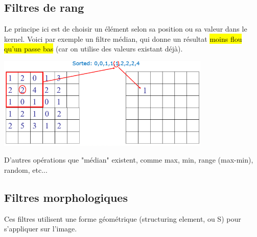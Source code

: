 \documentclass[letterpaper, 12pt]{article}
\newcommand{\alinea}{
\hspace*{0.5cm}}
\begin{document}
	\subsection{Filtres de rang}
		\alinea Le principe ici est de choisir un élément selon sa position ou sa valeur dans le kernel. Voici par exemple
			un filtre médian, qui donne un résultat \hl{moins flou qu'un passe bas} (car on utilise des valeurs existant déjà).
			\begin{center}
				\includegraphics[width=4in]{Images/rank}
			\end{center}
		\alinea D'autres opérations que "médian" existent, comme max, min, range (max-min), random, etc...
	\subsection{Filtres morphologiques}
		\alinea Ces filtres utilisent une forme géométrique (structuring element, ou S) pour s'appliquer sur l'image.
\end{document}
